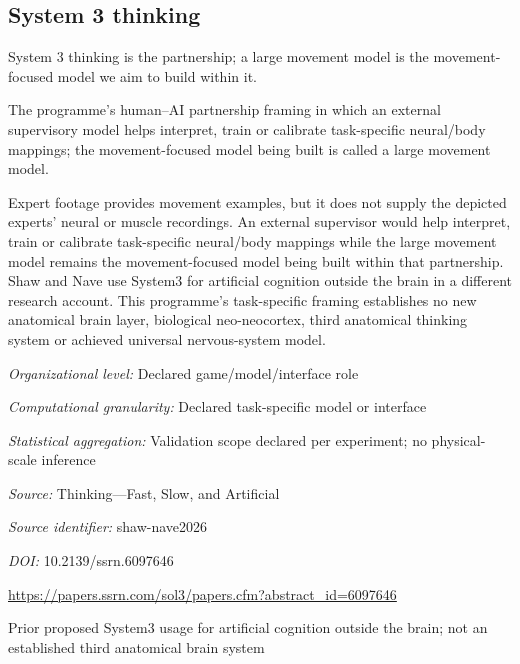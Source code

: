 \begin{samepage}
\subsection*{System 3 thinking}
\noindent System 3 thinking is the partnership; a large movement model is the movement-focused model we aim to build within it.\par
\end{samepage}
\noindent The programme’s human–AI partnership framing in which an external supervisory model helps interpret, train or calibrate task-specific neural/body mappings; the movement-focused model being built is called a large movement model.\par
\noindent Expert footage provides movement examples, but it does not supply the depicted experts’ neural or muscle recordings. An external supervisor would help interpret, train or calibrate task-specific neural/body mappings while the large movement model remains the movement-focused model being built within that partnership. Shaw and Nave use System3 for artificial cognition outside the brain in a different research account. This programme’s task-specific framing establishes no new anatomical brain layer, biological neo-neocortex, third anatomical thinking system or achieved universal nervous-system model.\par
\noindent\textit{Organizational level:} Declared game/model/interface role\par
\noindent\textit{Computational granularity:} Declared task-specific model or interface\par
\begin{samepage}
\noindent\textit{Statistical aggregation:} Validation scope declared per experiment; no physical-scale inference\par\nopagebreak[4]

\end{samepage}
\noindent\textit{Source:} Thinking—Fast, Slow, and Artificial\par
\noindent\textit{Source identifier:} shaw-nave2026\par
\noindent\textit{DOI:} 10.2139/ssrn.6097646\par
\noindent\url{https://papers.ssrn.com/sol3/papers.cfm?abstract_id=6097646}\par
\noindent Prior proposed System3 usage for artificial cognition outside the brain; not an established third anatomical brain system\par
